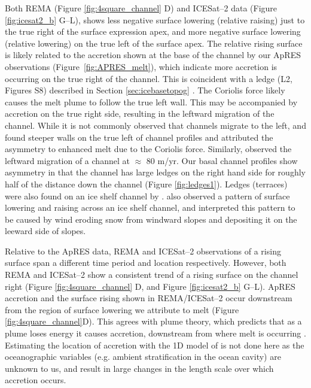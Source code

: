 Both REMA (Figure \ref{fig:4square_channel} D) and ICESat--2 data (Figure \ref{fig:icesat2_b} G--L),  shows less negative surface lowering (relative raising) just to the true right of the surface expression apex, and more negative surface lowering (relative lowering) on the true left of the surface apex. 
The relative rising surface is likely related to the accretion shown at the base of the channel by our ApRES observations (Figure~\ref{fig:APRES_melt}), which indicate more accretion is occurring on the true right of the channel. This  is coincident with a ledge (L2, Figures S8) described in Section \ref{sec:icebasetopog} . 
The Coriolis force likely causes the melt plume to follow the true left wall. This may be accompanied by accretion on the true right side, resulting in the leftward migration of the channel.   While it is not commonly observed that channels migrate to the left, \cite{gourmelen2017channelized} and \cite{alley2016impacts} found steeper walls on the true left of channel profiles and attributed the asymmetry to enhanced melt due to the Coriolis force. Similarly, \cite{chartrand2020basal} observed the leftward migration of a channel at $\approx$ 80 m/yr.
Our basal channel profiles show asymmetry in that the channel has large ledges on the right hand side for roughly half of the distance down the channel (Figure \ref{fig:ledges1}). Ledges (terraces) were also found on an ice shelf channel by \cite{dutrieux2014basal}.  \cite{drews2020atmospheric} also observed a pattern of surface lowering and raising across an ice shelf channel, and interpreted this pattern to be caused by wind eroding snow from windward slopes and depositing it on the leeward side of slopes. 

Relative to the ApRES data, REMA and ICESat--2 observations of a rising surface span a different time period and location respectively. However, both REMA and ICESat--2 show a consistent trend of a rising surface on the channel right (Figure \ref{fig:4square_channel} D, and Figure \ref{fig:icesat2_b} G--L). ApRES accretion and the surface rising shown in REMA/ICESat--2 occur downstream from the region of surface lowering we attribute to melt (Figure \ref{fig:4square_channel}D). This agrees with plume theory, which predicts that as a plume loses energy it causes accretion, downstream from where melt is occurring \cite{jenkins1991one}. Estimating the location of accretion with the 1D model of \cite{jenkins2011convection} is not done here as the oceanographic variables (e.g. ambient stratification in the ocean cavity) are unknown to us, and result in large changes in the length scale over which accretion occurs. 

